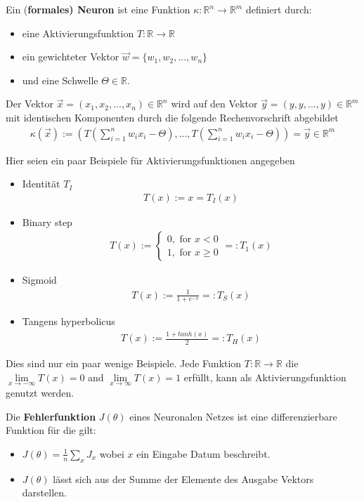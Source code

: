 \begin{definition}
\cite[Kapitel 1.2]{BurkhardLenze.1997} Ein (\textbf{formales) Neuron} ist eine Funktion $\kappa: \mathbb{R}^n \rightarrow \mathbb{R}^m$ definiert durch:
\begin{itemize}
\item eine Aktivierungsfunktion $T:\mathbb{R} \rightarrow \mathbb{R}$
\item ein gewichteter Vektor $\vec{w} = \{w_1,w_2,...,w_n\}$
\item und eine Schwelle  $\Theta\in\mathbb{R}$.
\end{itemize}
Der Vektor $\vec{x} = (x_1,x_2,...,x_n)\in \mathbb{R}^n$ wird auf den Vektor $\vec{y} = (y,y,...,y)\in \mathbb{R}^m$ mit identischen Komponenten durch die folgende Rechenvorschrift abgebildet
\begin{align}
\kappa(\vec{x}):= (T(\sum\limits_{i=1}^n w_i x_i - \Theta),...,T(\sum\limits_{i=1}^n w_i x_i - \Theta))=\vec{y} \in \mathbb{R}^m
\end{align}   
\end{definition}
Hier seien ein paar Beispiele für Aktivierungsfunktionen angegeben
\begin{itemize}
\item Identität $T_I$
\begin{align*}
T(x):=x=T_I(x)
\end{align*}
\item Binary step
\begin{align*}
T(x) := \begin{cases} 0, \text{ for } x < 0 \\ 1, \text{ for } x \geq 0 \end{cases} =: T_1 (x)
\end{align*}
\item Sigmoid
\begin{align*}
T(x) := \frac{1}{1+e^{-x}} =: T_S(x)
\end{align*}
\item Tangens hyperbolicus
\begin{align*}
T(x) := \frac{1+tanh(x)}{2} =: T_H(x)
\end{align*}
\end{itemize}
Dies sind nur ein paar wenige Beispiele.
Jede Funktion $T:\mathbb{R}\rightarrow \mathbb{R}$
die $\lim\limits_{x \rightarrow -\infty}{T(x)}=0$ 
and $\lim\limits_{x \rightarrow \infty}{T(x)}=1$ erfüllt,
kann als Aktivierungsfunktion genutzt werden.

\begin{definition}
    \cite[Kapitel 2]{MichaelNielsen.Juni2019}
    Die \textbf{Fehlerfunktion} $J(\theta)$ eines Neuronalen Netzes ist eine 
    differenzierbare Funktion für die gilt:
    \begin{itemize}
        \item $J(\theta) = \frac{1}{n} \sum_x J_x$ wobei $x$ ein Eingabe Datum
        beschreibt.
        \item $J(\theta)$ lässt sich aus der Summe der Elemente des Ausgabe Vektors
        darstellen.
    \end{itemize}
\end{definition}

